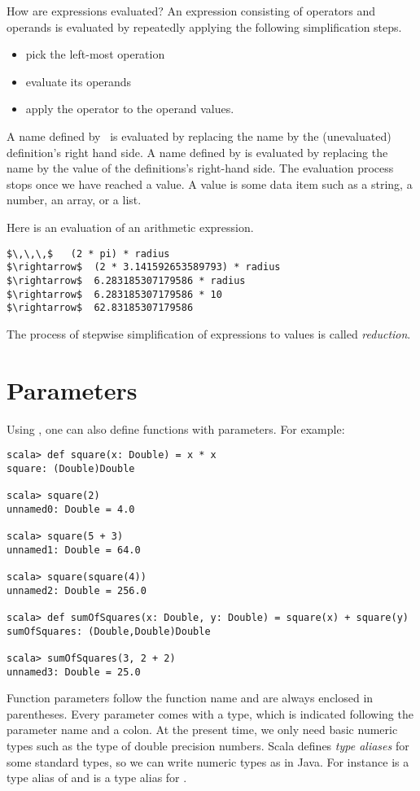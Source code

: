 How are expressions evaluated? An expression consisting of operators
and operands is evaluated by repeatedly applying the following
simplification steps.
\begin{itemize}
\item pick the left-most operation
\item evaluate its operands
\item apply the operator to the operand values.
\end{itemize}
A name defined by \ is evaluated by replacing the name by the
(unevaluated) definition's right hand side. A name defined by  is
evaluated by replacing the name by the value of the definitions's
right-hand side.  The evaluation process stops once we have reached a
value. A value is some data item such as a string, a number, an array,
or a list.

\example
Here is an evaluation of an arithmetic expression.
\begin{lstlisting}
$\,\,\,$   (2 * pi) * radius
$\rightarrow$  (2 * 3.141592653589793) * radius
$\rightarrow$  6.283185307179586 * radius
$\rightarrow$  6.283185307179586 * 10
$\rightarrow$  62.83185307179586
\end{lstlisting}
The process of stepwise simplification of expressions to values is
called {\em reduction}.

\section{Parameters}

Using , one can also define functions with parameters. For example:
\begin{lstlisting}
scala> def square(x: Double) = x * x
square: (Double)Double

scala> square(2)
unnamed0: Double = 4.0

scala> square(5 + 3)
unnamed1: Double = 64.0

scala> square(square(4))
unnamed2: Double = 256.0

scala> def sumOfSquares(x: Double, y: Double) = square(x) + square(y)
sumOfSquares: (Double,Double)Double

scala> sumOfSquares(3, 2 + 2)
unnamed3: Double = 25.0
\end{lstlisting}

Function parameters follow the function name and are always enclosed
in parentheses.  Every parameter comes with a type, which is indicated
following the parameter name and a colon.  At the present time, we
only need basic numeric types such as the type  of
double precision numbers. Scala defines {\em type aliases} for some
standard types, so we can write numeric types as in Java. For instance
 is a type alias of  and  is
a type alias for .

